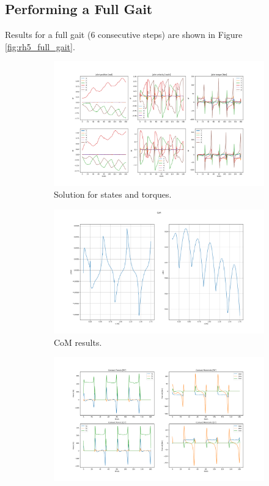 \subsection{Performing a Full Gait}
Results for a full gait (6 consecutive steps) are shown in Figure \ref{fig:rh5_full_gait}.
\begin{figure}[h!]
\centering
\begin{subfigure}{.5\textwidth}
  \centering
  \includegraphics[width=1\linewidth]{Media/Crocoddyl/RH5Legs/RH5Gait_Solution.png}
  \caption{Solution for states and torques.}
\end{subfigure}
\begin{subfigure}{.5\textwidth}
  \centering
\includegraphics[width=1\linewidth]{Media/Crocoddyl/RH5Legs/RH5Gait_CoM2.png}
\caption{CoM results.}
\end{subfigure}
\begin{subfigure}{.5\textwidth}
  \centering
\includegraphics[width=1\linewidth]{Media/Crocoddyl/RH5Legs/RH5Gait_ContactWrenches.png}

\end{subfigure}
\end{figure}
